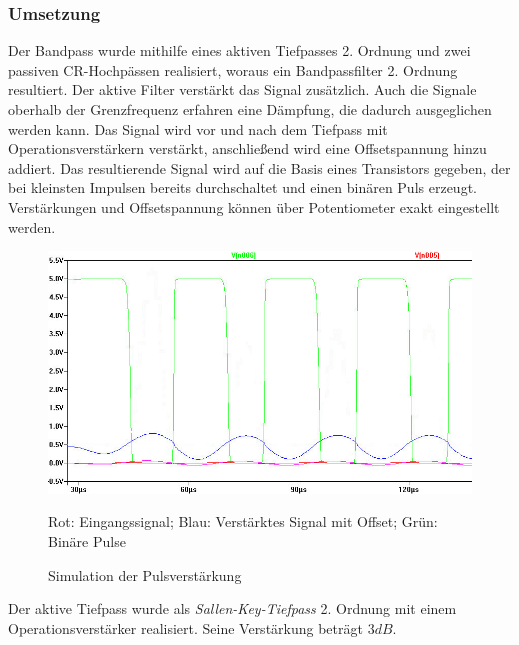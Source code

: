 \subsubsection{Umsetzung}
Der Bandpass wurde mithilfe eines aktiven Tiefpasses 2. Ordnung und zwei passiven CR-Hochpässen realisiert, woraus ein Bandpassfilter 2. Ordnung resultiert. Der aktive Filter verstärkt das Signal zusätzlich. Auch die Signale oberhalb der Grenzfrequenz erfahren eine Dämpfung, die dadurch ausgeglichen werden kann. Das Signal wird vor und nach dem Tiefpass mit Operationsverstärkern verstärkt, anschließend wird eine Offsetspannung hinzu addiert. Das resultierende Signal wird auf die Basis eines Transistors gegeben, der bei kleinsten Impulsen bereits durchschaltet und einen binären Puls erzeugt. Verstärkungen und Offsetspannung können über Potentiometer exakt eingestellt werden.
\begin{figure}[H]
\centering
\includegraphics[width=(\textwidth), angle=0]{sim/verstaerker_offset.jpg}
\caption{Simulation der Pulsverstärkung} \label{img:Sim1}
Rot: Eingangssignal; Blau: Verstärktes Signal mit Offset; Grün: Binäre Pulse
\end{figure}
Der aktive Tiefpass wurde als \textit{Sallen-Key-Tiefpass} 2. Ordnung mit einem Operationsverstärker realisiert. Seine Verstärkung beträgt $3dB$. \cite{opamp}
